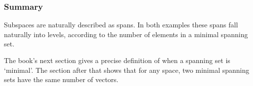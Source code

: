 \begin{frame}
  \frametitle{Summary}

Subspaces are naturally described as spans.
In both examples these spans fall naturally into levels, 
according to the 
number of elements in a minimal spanning set. 

The book's next section gives a precise definition of 
when a spanning set is `minimal'.
The section after that shows that for any space, 
two minimal spanning sets have the same number of vectors.
\end{frame}



% 

